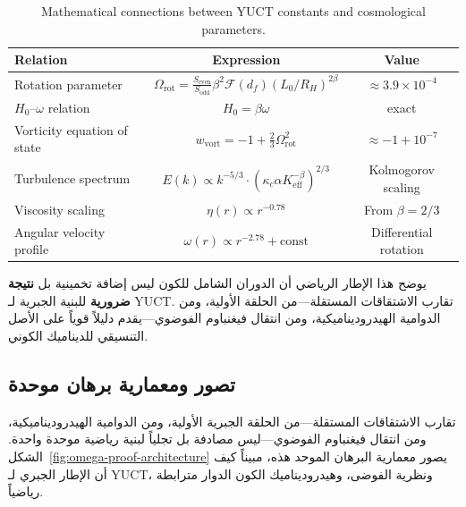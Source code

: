 \documentclass[12pt,a4paper]{article}
\begin{document}
	\begin{otherlanguage}{english}
		\begin{table}[htbp]
			\centering
			\caption{Mathematical connections between YUCT constants and cosmological parameters.}
			\label{tab:math-connections}
			\begin{tabular}{l c c}
				\toprule
				\textbf{Relation} & \textbf{Expression} & \textbf{Value} \\
				\midrule
				Rotation parameter & \(\Omega_{\mathrm{rot}} = \frac{S_{\mathrm{even}}}{S_{\mathrm{odd}}} \beta^2 \mathcal{F}(d_f) (L_0/R_H)^{2\beta}\) & \(\approx 3.9 \times 10^{-4}\) \\
				\(H_0\)–\(\omega\) relation & \(H_0 = \beta \omega\) & exact \\
				Vorticity equation of state & \(w_{\mathrm{vort}} = -1 + \frac{2}{3}\Omega_{\mathrm{rot}}^2\) & \(\approx -1 + 10^{-7}\) \\
				Turbulence spectrum & \(E(k) \propto k^{-5/3} \cdot (\kappa_c \alpha K_{\mathrm{eff}}^{-\beta})^{2/3}\) & Kolmogorov scaling \\
				Viscosity scaling & \(\eta(r) \propto r^{-0.78}\) & From \(\beta = 2/3\) \\
				Angular velocity profile & \(\omega(r) \propto r^{-2.78} + \text{const}\) & Differential rotation \\
				\bottomrule
			\end{tabular}
		\end{table}
	\end{otherlanguage}
	
	\noindent يوضح هذا الإطار الرياضي أن الدوران الشامل للكون ليس إضافة تخمينية بل \textbf{نتيجة ضرورية} للبنية الجبرية لـ YUCT. تقارب الاشتقاقات المستقلة---من الحلقة الأولية، ومن الدوامية الهيدروديناميكية، ومن انتقال فيغنباوم الفوضوي---يقدم دليلاً قوياً على الأصل التنسيقي للديناميك الكوني.
	
	\subsection{تصور ومعمارية برهان موحدة}
	\label{subsec:visualization}
	
	تقارب الاشتقاقات المستقلة---من الحلقة الجبرية الأولية، ومن الدوامية الهيدروديناميكية، ومن انتقال فيغنباوم الفوضوي---ليس مصادفة بل تجلياً لبنية رياضية موحدة واحدة. الشكل~\ref{fig:omega-proof-architecture} يصور معمارية البرهان الموحد هذه، مبيناً كيف أن الإطار الجبري لـ YUCT، ونظرية الفوضى، وهيدروديناميك الكون الدوار مترابطة رياضياً.
	
\end{document}
